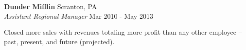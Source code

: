 \textbf{Dunder Mifflin} \hfill Scranton, PA\\
\textit{Assistant Regional Manager} \hfill Mar 2010 - May 2013\\
\vspace*{-4pt}
\begin{achievements}
	\item Closed more sales with revenues totaling more profit than any other employee – past, present, and future (projected).
\end{achievements}
